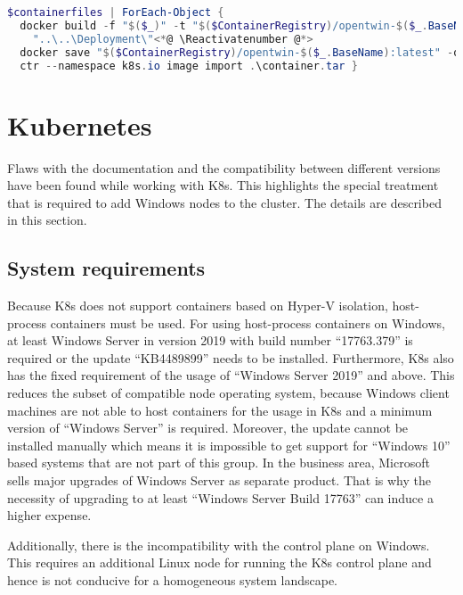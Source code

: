 \begin{lstlisting}[caption={Crucial commands used in the custom PowerShell script to automate process of image building.}, label=lst:results.image_namespace_build, language=powershell, morekeywords={docker, ctr}]
$containerfiles | ForEach-Object {
  docker build -f "$($_)" -t "$($ContainerRegistry)/opentwin-$($_.BaseName):latest" \<*@ \Suppressnumber @*>
    "..\..\Deployment\"<*@ \Reactivatenumber @*>
  docker save "$($ContainerRegistry)/opentwin-$($_.BaseName):latest" -o container.tar
  ctr --namespace k8s.io image import .\container.tar }
\end{lstlisting}


\section{Kubernetes}
Flaws with the documentation and the compatibility between different versions have been found while working with \ac{K8s}. This highlights the special treatment that is required to add \ac{Windows} nodes to the cluster. The details are described in this section.
 
\subsection{System requirements}
Because \ac{K8s} does not support containers based on Hyper-V isolation\cite{Kubernetes.20230227}, host-process containers must be used.
For using host-process containers on \ac{Windows}, at least Windows Server in version 2019 with build number \enquote{17763.379} is required or the update \enquote{KB4489899} needs to be installed\cite{GitHubKubernetesSIGWindowsTools.20230213}. Furthermore, \ac{K8s} also has the fixed requirement of the usage of \enquote{Windows Server 2019} and above\cite{Kubernetes.20230227}. This reduces the subset of compatible node operating system, because \ac{Windows} client machines are not able to host containers for the usage in \ac{K8s} and a minimum version of \enquote{Windows Server} is required.
Moreover, the update cannot be installed manually which means it is impossible to get support for \enquote{Windows 10} based systems that are not part of this group. In the business area, Microsoft sells major upgrades of Windows Server as separate product. That is why the necessity of upgrading to at least \enquote{Windows Server Build 17763} can induce a higher expense.

Additionally, there is the incompatibility with the control plane on \ac{Windows}. This requires an additional Linux node for running the \ac{K8s} control plane and hence is not conducive for a homogeneous system landscape. 

